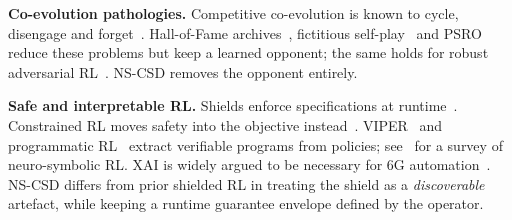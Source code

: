 \textbf{Co-evolution pathologies.} Competitive co-evolution is known to cycle,
disengage and forget~\cite{ficici1998challenges,watson2001minimal,balduzzi2019openended}.
Hall-of-Fame archives~\cite{rosin1997newmethods}, fictitious self-play~\cite{heinrich2015fsp}
and PSRO~\cite{lanctot2017psro} reduce these problems but keep a learned
opponent; the same holds for robust adversarial RL~\cite{pinto2017rarl}.
NS-CSD removes the opponent entirely.

\textbf{Safe and interpretable RL.} Shields enforce specifications at
runtime~\cite{alshiekh2018shielding,konighofer2021online}. Constrained RL moves
safety into the objective instead~\cite{achiam2017cpo,garcia2015saferl}.
VIPER~\cite{bastani2018viper} and programmatic RL~\cite{verma2018pirl} extract
verifiable programs from policies; see~\cite{acharya2023neurosymbolic} for a
survey of neuro-symbolic RL. XAI is widely argued to be necessary for 6G
automation~\cite{guo2020xai6g,wang2021xai6g}. NS-CSD differs from prior shielded
RL in treating the shield as a \emph{discoverable} artefact, while keeping a
runtime guarantee envelope defined by the operator.
